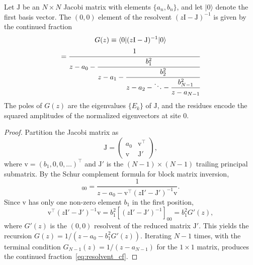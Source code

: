 \documentclass[10pt,a4paper]{amsart}
\begin{document}
\begin{theorem}
\label{thm:resolvent_cf}
Let $\mathrm{J}$ be an $N \times N$ Jacobi matrix with elements $\{a_n, b_n\}$, and let $|0\rangle$ denote the first basis vector. The $(0,0)$ element of the resolvent $(z\mathrm{I} - \mathrm{J})^{-1}$ is given by the continued fraction
\begin{multline}
G(z) \equiv 
\langle 0 | (z\mathrm{I} - \mathrm{J})^{-1} | 0 \rangle \\
= \cfrac{1}{z - a_0
 - \cfrac{b_1^2}{z - a_1
 - \cfrac{b_2^2}{z - a_2
 - \ddots
 - \cfrac{b_{N-1}^2}{z - a_{N-1}}}}}
\label{eq:resolvent_cf}
\end{multline}
The poles of $G(z)$ are the eigenvalues $\{E_k\}$ of $\mathrm{J}$, and the residues encode the squared amplitudes of the normalized eigenvectors at site $0$.
\end{theorem}

\begin{proof}
Partition the Jacobi matrix as
\begin{equation}
\mathrm{J} = \begin{pmatrix}
a_0 & \mathrm{v}^\top \\
\mathrm{v} & \mathrm{J}'
\end{pmatrix},
\end{equation}
where $\mathrm{v} = (b_1, 0, 0, \ldots)^\top$ and $\mathrm{J}'$ is the $(N-1) \times (N-1)$ trailing principal submatrix. By the Schur complement formula for block matrix inversion,
\begin{equation}
[(z\mathrm{I} - \mathrm{J})^{-1}]_{00} = \frac{1}{z - a_0 - \mathrm{v}^\top (z\mathrm{I}' - \mathrm{J}')^{-1} \mathrm{v}}.
\end{equation}
Since $\mathrm{v}$ has only one non-zero element $b_1$ in the first position,
\begin{equation}
\mathrm{v}^\top (z\mathrm{I}' - \mathrm{J}')^{-1} \mathrm{v} = b_1^2 [(z\mathrm{I}' - \mathrm{J}')^{-1}]_{00} = b_1^2 G'(z),
\end{equation}
where $G'(z)$ is the $(0,0)$ resolvent of the reduced matrix $\mathrm{J}'$. This yields the recursion $G(z) = 1/(z - a_0 - b_1^2 G'(z))$. Iterating $N-1$ times, with the terminal condition $G_{N-1}(z) = 1/(z - a_{N-1})$ for the $1 \times 1$ matrix, produces the continued fraction~\eqref{eq:resolvent_cf}.
\end{proof}
\end{document}
